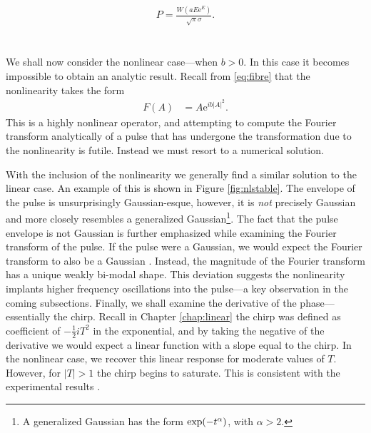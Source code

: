 \documentclass[10pt,twocolumn,a4paper]{article}
\let\originalleft\left
\let\originalright\right
\renewcommand{\left}{\mathopen{}\mathclose\bgroup\originalleft}
\renewcommand{\right}{\aftergroup\egroup\originalright}
\begin{document}
\begin{align}
P = \frac{W(a E \textrm{e}^E)}{\sqrt{\pi} \sigma}.
\label{eq:equilpower}
\end{align}



\section{}
We shall now consider the nonlinear case---when $b > 0$. In this case it becomes impossible to obtain an analytic result. Recall from \eqref{eq:fibre} that the nonlinearity takes the form
\begin{align*}
F(A) &= A \textrm{e}^{i b |A|^2}.
\end{align*}
This is a highly nonlinear operator, and attempting to compute the Fourier transform analytically of a pulse that has undergone the transformation due to the nonlinearity is futile. Instead we must resort to a numerical solution.




With the inclusion of the nonlinearity we generally find a similar solution to the linear case. An example of this is shown in Figure \ref{fig:nlstable}. The envelope of the pulse is unsurprisingly Gaussian-esque, however, it is \emph{not} precisely Gaussian and more closely resembles a generalized Gaussian\footnote{A generalized Gaussian has the form $\exp \left(-t^\alpha \right)$, with $\alpha > 2$.}. The fact that the pulse envelope is not Gaussian is further emphasized while examining the Fourier transform of the pulse. If the pulse were a Gaussian, we would expect the Fourier transform to also be a Gaussian \cite{debnath, gradshteyn}. Instead, the magnitude of the Fourier transform has a unique weakly bi-modal shape. This deviation suggests the nonlinearity implants higher frequency oscillations into the pulse---a key observation in the coming subsections. Finally, we shall examine the derivative of the phase---essentially the chirp. Recall in Chapter \ref{chap:linear} the chirp was defined as coefficient of $-\frac{1}{2}iT^2$ in the exponential, and by taking the negative of the derivative we would expect a linear function with a slope equal to the chirp. In the nonlinear case, we recover this linear response for moderate values of $T$. However, for $|T| > 1$ the chirp begins to saturate. This is consistent with the experimental results \cite{chen, rothenberg, tomlinson}.
\end{document}
